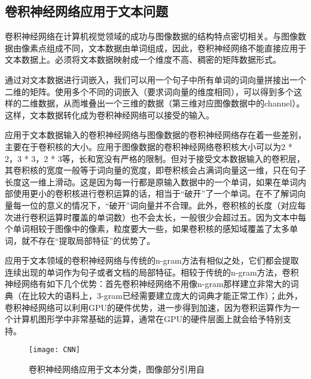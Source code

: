 \subsection{卷积神经网络应用于文本问题}
卷积神经网络在计算机视觉领域的成功与图像数据的结构特点密切相关。与图像数据由像素点组成不同，文本数据由单词组成，因此，卷积神经网络不能直接应用于文本数据上。必须将文本数据映射成一个维度不高、稠密的矩阵数据形式。

通过对文本数据进行词嵌入，我们可以用一个句子中所有单词的词向量拼接出一个二维的矩阵。使用多个不同的词嵌入（要求词向量的维度相同），可以得到多个这样的二维数据，从而堆叠出一个三维的数据（第三维对应图像数据中的channel）。这样，文本数据转化成为卷积神经网络可以接受的输入。

应用于文本数据输入的卷积神经网络与图像数据的卷积神经网络存在着一些差别，主要在于卷积核的大小。应用于图像数据的卷积神经网络卷积核大小可以为2 * 2，3 * 3，2 * 3等，长和宽没有严格的限制。但对于接受文本数据输入的卷积层，其卷积核的宽度一般等于词向量的宽度，即卷积核会占满词向量这一维，只在句子长度这一维上滑动。这是因为每一行都是原输入数据中的一个单词，如果在单词内部使用更小的卷积核进行卷积运算的话，相当于“破开”了一个单词。在不了解词向量每一位的意义的情况下，“破开”词向量并不合理。此外，卷积核的长度（对应每次进行卷积运算时覆盖的单词数）也不会太长，一般很少会超过五。因为文本中每个单词相较于图像中的像素，粒度要大一些，如果卷积核的感知域覆盖了太多单词，就不存在“提取局部特征”的优势了。

应用于文本领域的卷积神经网络与传统的n-gram方法有相似之处，它们都会提取连续出现的单词作为句子或者文档的局部特征。相较于传统的n-gram方法，卷积神经网络有如下几个优势：首先卷积神经网络不用像n-gram那样建立非常大的词典（在比较大的语料上，3-gram已经需要建立庞大的词典才能正常工作）；此外，卷积神经网络可以利用GPU的硬件优势，进一步得到加速，因为卷积运算作为一个计算机图形学中非常基础的运算，通常在GPU的硬件层面上就会给予特别支持。

\begin{figure}[ht]
\centering
\texttt{[image: CNN]}
\caption{卷积神经网络应用于文本分类，图像部分引用自\cite{kim.2014.convolutional}} \label{fig:CNN}
\end{figure}

